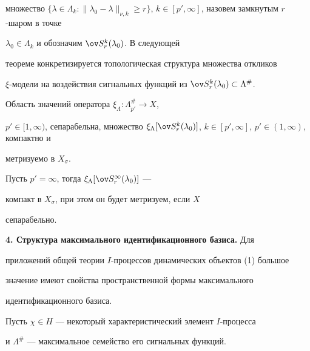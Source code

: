 множество $\{\lambda\in \Lambda_k:\|\lambda_0-\lambda\|_{\nu,k}\ge 


r\}$, $k\in[p',\infty]$, назовем замкнутым $r$-шаром в точке 


$\lambda_0\in\Lambda_k$ и обозначим $\ov S^k_r(\lambda_0)$. В следующей 


теореме конкретизируется топологическая структура множества откликов 


$\xi$-модели на воздействия сигнальных функций из $\ov 


S^k_r(\lambda_0)\subset \Lambda^{\#}$. 


 


\begin{thm} 


Область значений оператора $\xi_\Lambda:\Lambda^{\#}_{p'}\to X$, 


$p'\in[1,\infty)$, сепарабельна, множество $\xi_\Lambda[\ov 


S^k_r(\lambda_0)]$, $k\in[p',\infty]$, $p'\in(1,\infty)$, компактно и 


метризуемо в $X_\sigma$. 


\end{thm} 


 


\begin{cor} 


Пусть $p'=\infty$, тогда $\xi_\Lambda[\ov S^\infty_r(\lambda_0)]$ --- 


компакт в $X_{\sigma}$, при этом он будет метризуем, если $X$ 


сепарабельно. 


\end{cor} 


 


{\bf 4. Структура максимального идентификационного базиса.} Для 


приложений общей теории $I$-процессов динамических объектов (1) большое 


значение имеют свойства пространственной формы максимального 


идентификационного базиса. 


 


Пусть $\chi\in H$ --- некоторый характеристический элемент $I$-процесса 


и $\Lambda^{\#}$ --- максимальное семейство его сигнальных функций. 


